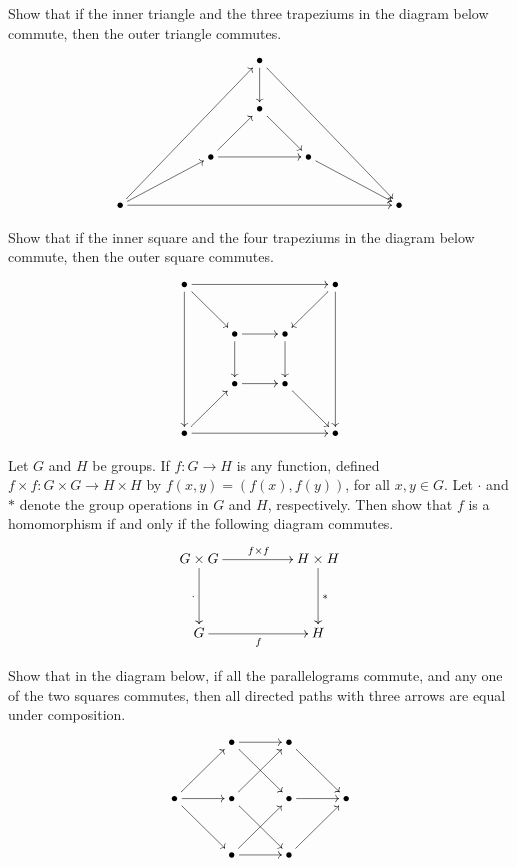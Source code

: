 \begin{Exercise}
Show that if the inner triangle and the three trapeziums in the diagram below commute, then the outer triangle commutes.
\begin{equation*}
\xymatrix{
&&& \bullet \ar[d] \ar[rrrddd] &&& \\
&&& \bullet \ar[rd] &&& \\
&& \bullet \ar[ur] \ar[rr] && \bullet \ar[rrd] && \\
\bullet \ar[rrruuu] \ar[rru] \ar[rrrrrr] &&&&&& \bullet
}
\end{equation*}
\end{Exercise}

\begin{Exercise}
Show that if the inner square and the four trapeziums in the diagram below commute, then the outer square commutes.
\begin{equation*}
\xymatrix@=2.5em{
\bullet \ar[ddd] \ar[rd] \ar[rrr] &&& \bullet \ar[ld] \ar[ddd] \\
& \bullet \ar[d] \ar[r] & \bullet \ar[d] & \\
& \bullet \ar[r] & \bullet \ar[rd] & \\
\bullet \ar[ru] \ar[rrr] &&& \bullet
}
\end{equation*}
\end{Exercise}

\begin{Exercise}
Let $G$ and $H$ be groups. If $f \colon G \to H$ is any function, defined $f \times f \colon G \times G \to H \times H$ by $f(x, y) = (f(x), f(y))$, for all $x, y \in G$. Let $\cdot$ and $*$ denote the group operations in $G$ and $H$, respectively. Then show that $f$ is a homomorphism if and only if the following diagram commutes.
\begin{equation*}
\xymatrix@C=5em@R=4em{
G \times G \ar[r]^{f \times f} \ar[d]_\cdot & H \times H \ar[d]^{*} \\
G \ar[r]_f & H
}
\end{equation*}
\end{Exercise}

\begin{Exercise}
Show that in the diagram below, if all the parallelograms commute, and any one of the two squares commutes, then all directed paths with three arrows are equal under composition.
\begin{equation*}
\xymatrix@=3em{
& \bullet \ar[r] \ar[rd] & \bullet \ar[rd] & \\
\bullet \ar[r] \ar[rd] \ar[ru] & \bullet \ar[rd] \ar[ru] & \bullet \ar[r] & \bullet \\
& \bullet \ar[r] \ar[ru] & \bullet \ar[ru] &
}
\end{equation*}
\end{Exercise}

